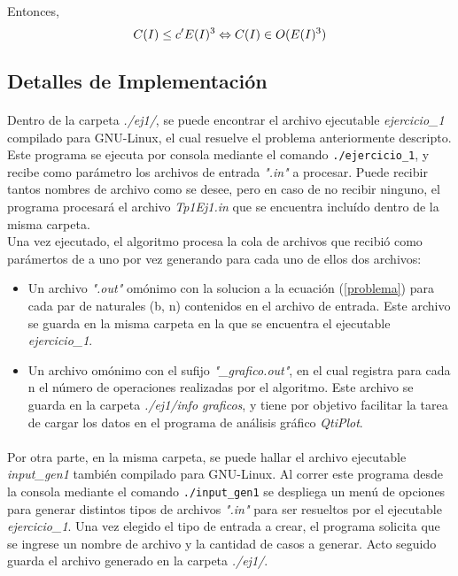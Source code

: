 Entonces,
\begin{equation}
	C(I) \leq c' E(I)^{3} \Leftrightarrow C(I) \in O(E(I)^{3})
\end{equation}

\subsection{Detalles de Implementación}

\paragraph{}
Dentro de la carpeta \textit{./ej1/}, se puede encontrar el archivo ejecutable \textit{ejercicio\_1} compilado para GNU-Linux, el cual resuelve el problema anteriormente descripto. Este programa se ejecuta por consola mediante el comando \texttt{./ejercicio\_1}, y recibe como parámetro los archivos de entrada \textit{".in"} a procesar. Puede recibir tantos nombres de archivo como se desee, pero en caso de no recibir ninguno, el programa procesará el archivo \textit{Tp1Ej1.in} que se encuentra incluído dentro de la misma carpeta. \\
Una vez ejecutado, el algoritmo procesa la cola de archivos que recibió como parámertos de a uno por vez generando para cada uno de ellos dos archivos:
	\begin{itemize}
		\item{Un archivo \textit{".out"} omónimo con la solucion a la ecuación (\ref{problema}) para cada par de naturales (b, n) contenidos en el archivo de entrada. Este archivo se guarda en la misma carpeta en la que se encuentra el ejecutable \textit{ejercicio\_1}}.
		\item{Un archivo omónimo con el sufijo \textit{"\_grafico.out"}, en el cual registra para cada n el número de operaciones realizadas por el algoritmo. Este archivo se guarda en la carpeta \textit{./ej1/info graficos}, y tiene por objetivo facilitar la tarea de cargar los datos en el programa de análisis gráfico \textit{QtiPlot}}.
	\end{itemize}

\paragraph{}		
Por otra parte, en la misma carpeta, se puede hallar el archivo ejecutable \textit{input\_gen1} también compilado para GNU-Linux. Al correr este programa desde la consola mediante el comando \texttt{./input\_gen1} se despliega un menú de opciones para generar distintos tipos de archivos \textit{".in"} para ser resueltos por el ejecutable \textit{ejercicio\_1}. Una vez elegido el tipo de entrada a crear, el programa solicita que se ingrese un nombre de archivo y la cantidad de casos a generar. Acto seguido guarda el archivo generado en la carpeta \textit{./ej1/}.

